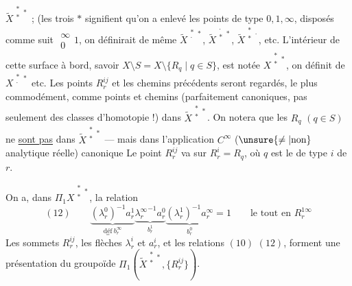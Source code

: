 
$\widetilde{X}^{\substack{*\\*}*}$ ; (les trois $*$ signifient qu'on a enlevé  les points de type $0,1,\infty$, disposés comme suit $\substack{\infty\\0}1$, on définirait de même $\widetilde{X}^{\substack{*\\\cdot}*}$, $\widetilde{X}^{\substack{\cdot\\*}*}$, $\widetilde{X}^{\substack{*\\*}\cdot}$, etc.  L'intérieur de cette surface à bord, savoir $X\setminus S=X\setminus\{R_q\mid q\in S\}$, est notée $X^{\substack{*\\*}*}$, on définit de \unsure{=} $X^{\substack{*\\\cdot}*}$ etc. Les points $R_r^{ij}$ et les chemins précédents seront regardés, le plus commodément, comme points et chemins (parfaitement canoniques, pas seulement des classes d'homotopie !) dans $\widetilde{X}^{\substack{*\\*}*}$. On notera que les $R_q$ $(q\in S)$ ne \uline{sont pas} dans $\widetilde{X}^{\substack{*\\*}*}$ --- mais dans l'application $C^\infty$ ($\unsure{\ne|\text{non}}$ analytique réelle) canonique
Le point $R_r^{ij}$ va sur $R_r^i=R_q$, où $q$ est le  de type $i$ de $r$.

On a, dans $\Pi_1 X^{\substack{*\\*}*}$, la relation
\[
(12)\qquad
\boxed{
\underbrace{(\lambda_r^0)^{-1}a_r^1}_{\underset{=}{\text{déf}}\ b_r^\infty}
\underbrace{{\lambda_r^\infty}^{-1}a_r^0}_{b_r^1}
\underbrace{(\lambda_r^1)^{-1}a_r^\infty}_{b_r^0}=1
}
\qquad\text{le tout en }R_r^{1\infty}
\]
Les sommets $R_r^{ij}$, les flèches $\lambda_r^i$ et $a_r^i$, et les relations $(10)$ $(12)$, forment une présentation du groupoïde $\Pi_1(\widetilde{X}^{\substack{*\\*}*},\{R_r^{ij}\})$.

